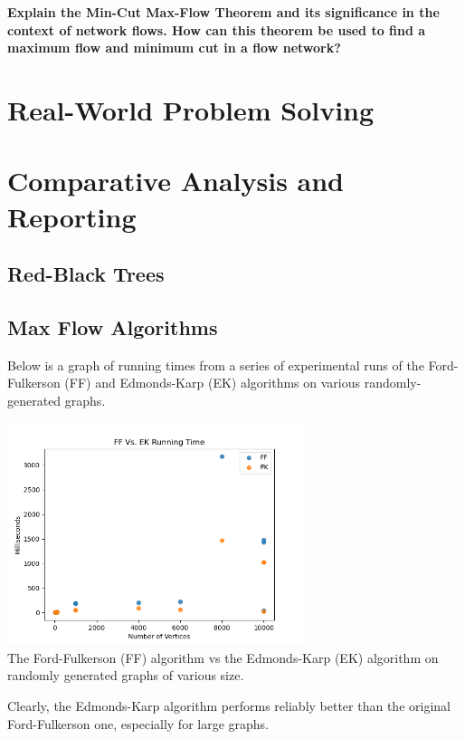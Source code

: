 \documentclass[12pt]{amsart}
\begin{document}
    \textbf{Explain the Min-Cut Max-Flow Theorem and its
    significance in the context of network flows. How can this
    theorem be used to find a maximum flow and minimum cut in a
    flow network?}

\section{Real-World Problem Solving}

\section{Comparative Analysis and Reporting}

\subsection{Red-Black Trees}

\subsection{Max Flow Algorithms}

    Below is a graph of running times from a series of
    experimental runs of the Ford-Fulkerson (FF) and
    Edmonds-Karp (EK) algorithms on various randomly-generated
    graphs.

\begin{center}
    \includegraphics[width=0.65\textwidth]{mf_algorithm_comparison} \\
    The Ford-Fulkerson (FF) algorithm vs the Edmonds-Karp (EK)
    algorithm on randomly generated graphs of various size. \\
    \vskip 1cm
\end{center}

    Clearly, the Edmonds-Karp algorithm performs reliably
    better than the original Ford-Fulkerson one, especially for
    large graphs.
\end{document}
